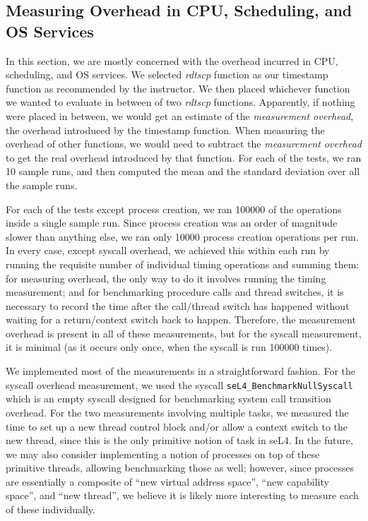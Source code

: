 \subsection{Measuring Overhead in CPU, Scheduling, and OS Services}
%
In this section, we are mostly concerned with the overhead incurred in
CPU, scheduling, and OS services.
%
We selected \textit{rdtscp} function as our timestamp function as
recommended by the instructor.
%
We then placed whichever function we wanted to evaluate in between of two \textit{rdtscp} functions.
%
Apparently, if nothing were placed in between, we would get an estimate of the \textit{measurement overhead}, 
the overhead introduced by the timestamp function.
%
When measuring the overhead of other functions, we would need to
subtract the \textit{measurement overhead} to get the real overhead
introduced by that function.
%
For each of the tests, we ran 10 sample runs, and then computed the
mean and the standard deviation over all the sample runs.
%

For each of the tests except process creation, we ran 100000 of the
operations inside a single sample run.
%
Since process creation was an order of magnitude slower than anything
else, we ran only 10000 process creation operations per run.
%
In every case, except syscall overhead, we achieved this within each
run by running the requisite number of individual timing operations
and summing them: for measuring overhead, the only way to do it
involves running the timing measurement; and for benchmarking
procedure calls and thread switches, it is necessary to record the
time after the call/thread switch has happened without waiting for a
return/context switch back to happen.
%
Therefore, the measurement overhead is present in all of these
measurements, but for the syscall measurement, it is minimal (as it
occurs only once, when the syscall is run 100000 times).

We implemented most of the measurements in a straightforward fashion.
%
For the syscall overhead measurement, we used the syscall
\verb|seL4_BenchmarkNullSyscall| which is an empty syscall designed
for benchmarking system call transition overhead.
%
For the two measurements involving multiple tasks, we measured the
time to set up a new thread control block and/or allow a context
switch to the new thread, since this is the only primitive notion of
task in seL4.
%
In the future, we may also consider implementing a notion of processes
on top of these primitive threads, allowing benchmarking those as
well; however, since processes are essentially a composite of ``new
virtual address space'', ``new capability space'', and ``new thread'',
we believe it is likely more interesting to measure each of these
individually.
